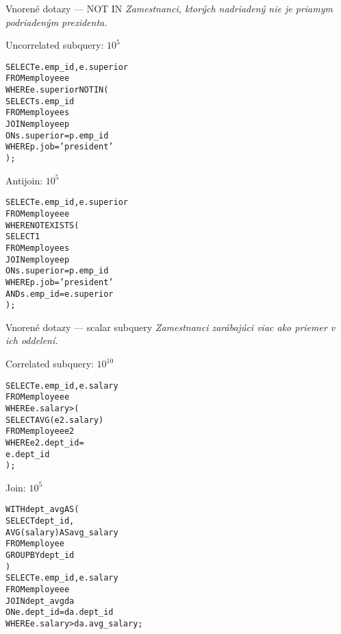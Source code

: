\documentclass[12pt]{beamer}
\def\blue#1{\textcolor{Cerulean}{#1}}
\begin{document}
\begin{frame}[fragile]{Vnorené dotazy --- NOT IN}
\footnotesize
\emph{Zamestnanci, ktorých nadriadený nie je priamym podriadeným prezidenta.}\\[7mm]
\begin{minipage}{.4\pdfpagewidth}
\alert{Un}correlated subquery: $10^5$
\footnotesize
\begin{alltt}
SELECT e.emp_id, e.superior
FROM employee e
WHERE \blue{e.superior NOT IN} (
  SELECT \blue{s.emp_id}
  FROM employee s
  JOIN employee p
    ON s.superior = p.emp_id
  WHERE p.job = 'president'
);

\end{alltt}
\end{minipage}
\hfill\vline\hfill
\begin{minipage}{.4\pdfpagewidth}
Antijoin: $10^5$
\footnotesize
\begin{alltt}
SELECT e.emp_id, e.superior
FROM employee e
WHERE \blue{NOT EXISTS} (
  SELECT 1
  FROM employee s
  JOIN employee p
    ON s.superior = p.emp_id
  WHERE p.job = 'president'
    \blue{AND s.emp_id = e.superior}
);
\end{alltt}
\end{minipage}
\end{frame}

\begin{frame}[fragile]{Vnorené dotazy --- scalar subquery}
\footnotesize
\emph{Zamestnanci zarábajúci viac ako priemer v ich oddelení.}\\[7mm]
\begin{minipage}{.4\pdfpagewidth}
Correlated subquery: $10^{10}$
\footnotesize
\begin{alltt}
SELECT e.emp_id, e.salary
FROM employee e
WHERE \blue{e.salary >} (
  SELECT AVG(e2.salary)
  FROM employee e2
  WHERE e2.dept_id = 
    e.dept_id
);



\end{alltt}
\end{minipage}
\hfill\vline\hfill
\begin{minipage}{.4\pdfpagewidth}
Join: $10^{5}$
\footnotesize
\begin{alltt}
WITH dept_avg AS (
  SELECT dept_id,
    AVG(salary) AS avg_salary
  FROM employee
  GROUP BY dept_id
)
SELECT e.emp_id, e.salary
FROM employee e
  JOIN dept_avg da
    ON e.dept_id = da.dept_id
WHERE \blue{e.salary >} da.avg_salary;
\end{alltt}
\end{minipage}
\end{frame}
\end{document}

